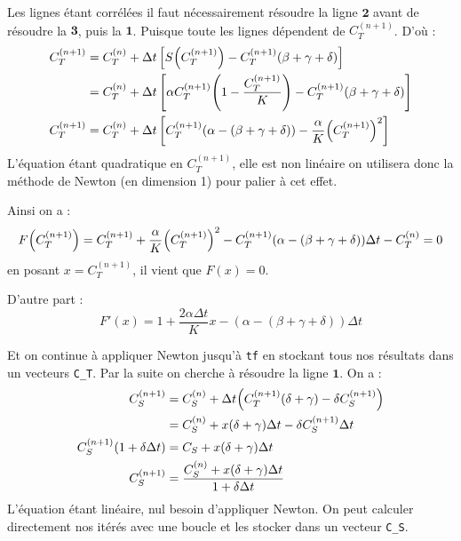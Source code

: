 \documentclass[12pt]{article}
\theoremstyle{saav}
\newcommand{\parr}[1]{\hspace{-0.05cm}\left(#1 \right)}
\newcommand{\rect}[1]{\left[ #1 \right]}
\begin{document}
		Les lignes étant corrélées il faut nécessairement résoudre la ligne $\boldsymbol{2}$ avant de résoudre la $\boldsymbol{3}$, puis la $\boldsymbol{1}$.  Puisque toute les lignes dépendent de $C_{T}^{(n+1)}$.
		D'où :
		\begin{align*}
			C_{T}^{(n+1)} &=  C_{T}^{(n)} + \Delta t \rect{ S\parr{C_{T}^{(n+1)}} - C_{T}^{(n+1)}(\beta + \gamma + \delta ) }
			\\
			&= C_{T}^{(n)} +  \Delta t \rect{ \alpha C_{T}^{(n+1)} \parr{1 - \frac{C_{T}^{(n+1)}}{K}}  - C_{T}^{(n+1)}(\beta + \gamma + \delta ) }
			\\
			C_{T}^{(n+1)}	&= C_{T}^{(n)} + \Delta t \rect{ C_{T}^{(n+1)} (\alpha - (\beta + \gamma + \delta )) - \frac{\alpha}{K}\parr{C_{T}^{(n+1)}}^{2} }
		\end{align*}
		L'équation étant quadratique en $C_{T}^{(n+1)}$, elle est non linéaire on utilisera donc la méthode de Newton (en dimension 1) pour palier à cet effet.
		
		Ainsi on a :
		\begin{equation*}
			F\parr{C_{T}^{(n+1)}} = C_{T}^{(n+1)} + \frac{\alpha}{K}\parr{C_{T}^{(n+1)}}^{2}  - C_{T}^{(n+1)} (\alpha - (\beta + \gamma + \delta )) \Delta t  - C_{T}^{(n)}=0
		\end{equation*}
		en posant $x= C_{T}^{(n+1)}$, il vient que $F(x) = 0$. 
		
		
		D'autre part : 
		\begin{equation*}
			F'(x) = 1 + \frac{2 \alpha \Delta t}{K}x - (\alpha - (\beta+ \gamma + \delta )) \Delta t 
		\end{equation*}
		
		Et on continue à appliquer Newton jusqu'à \texttt{tf} en stockant tous nos résultats dans un vecteurs \texttt{C\_T}. Par la suite on cherche à résoudre la ligne $\boldsymbol{1}$. On a :
		\begin{align*}
			C_{S}^{(n+1)} &= C_{S}^{(n)} + \Delta t \parr{C_{T}^{(n+1)} (\delta + \gamma ) - \delta C_{S}^{(n+1)}}
			\\
			&= C_{S}^{(n)} + x (\delta + \gamma )\Delta t - \delta C_{S}^{(n+1)} \Delta t 
			\\
			C_{S}^{(n+1)} \parr{1 + \delta \Delta t }&= C_{S} + x(\delta + \gamma )\Delta t
			\\
			C_{S}^{(n+1)}&=\frac{C_{S}^{(n)} + x(\delta + \gamma) \Delta t }{1+  \delta \Delta t}
		\end{align*}
		L'équation étant linéaire, nul besoin d'appliquer Newton. On peut calculer directement nos itérés avec une boucle et les stocker dans un vecteur \texttt{C\_S}. 
		
\end{document}
